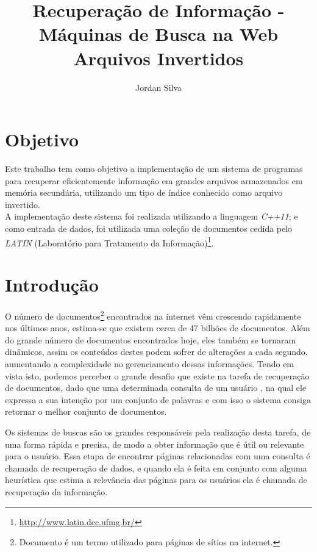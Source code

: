 \documentclass[12pt]{article}
\title{Recuperação de Informação - Máquinas de Busca na Web\\ Arquivos Invertidos}
\author{Jordan Silva\inst{1} }
\begin{document}
 

\maketitle


\section{Objetivo} \label{sec:goal}

Este trabalho tem como objetivo a implementação de um sistema de programas para recuperar eficientemente informação em grandes arquivos armazenados em memória secundária, utilizando um tipo de índice conhecido como arquivo invertido.
\\
\indent A implementação deste sistema foi realizada utilizando a linguagem \textit{C++11}; e como entrada de dados, foi utilizada uma coleção de documentos cedida pelo \textit{LATIN} (Laboratório para Tratamento da Informação)\footnote{\url{http://www.latin.dcc.ufmg.br/}}.

\section{Introdução} \label{sec:intro}

O número de documentos\footnote{Documento é um termo utilizado para páginas de sítios na internet.} encontrados na internet vêm crescendo rapidamente nos últimos anos, estima-se que existem cerca de 47 bilhões de documentos. Além do grande número de documentos encontrados hoje, eles também se tornaram dinâmicos, assim os conteúdos destes podem sofrer de alterações a cada segundo, aumentando a complexidade no gerenciamento dessas informações.
Tendo em vista isto, podemos perceber o grande desafio que existe na tarefa de recuperação de documentos, dado que uma determinada consulta  de um usuário , na qual ele expressa a sua intenção por um conjunto de palavras  e com isso o sistema consiga retornar o melhor conjunto de documentos.

Os sistemas de buscas são os grandes responsáveis pela realização desta tarefa, de uma forma rápida e precisa, de modo a obter informação que é útil ou relevante para o usuário. Essa etapa de encontrar páginas relacionadas com uma consulta é chamada de recuperação de dados, e quando ela é feita em conjunto com alguma heurística que estima a relevância das páginas para os usuários ela é chamada de recuperação da informação. \cite{Baeza-Yates:1999:MIR:553876}
\end{document}
